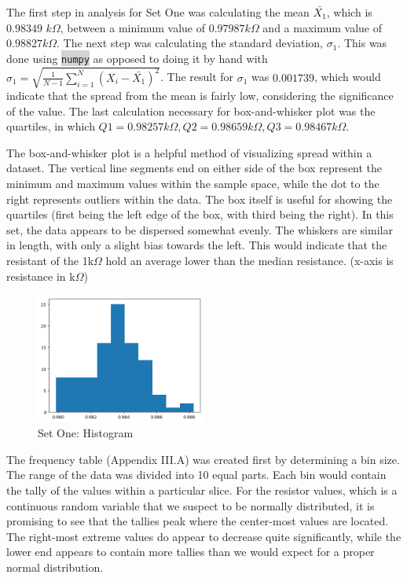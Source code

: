 \documentclass[10pt]{report}
\newcommand{\inlinecode}[2]{\colorbox{lightgray}{\lstinline[language=#1]$#2$}}
\begin{document}
The first step in analysis for Set One was calculating the mean $\bar{X_1}$, which is  $0.98349$ $k\Omega$,
between a minimum value of $0.97987 k\Omega$ and a maximum value of $0.98827 k\Omega$. The next step was calculating
the standard deviation, $\sigma_1$. This was done using \inlinecode{Python}{numpy} as opposed
to doing it by hand with $\sigma_1 = \sqrt{\frac{1}{N-1} \sum_{i=1}^N (X_i - \bar{X_1})^2}$.
The result for $\sigma_1$ was $0.001739$, which would indicate that the spread from the mean is fairly low,
considering the significance of the value.
The last calculation necessary for box-and-whisker plot was the quartiles,
in which $Q1 = 0.98257 k\Omega, Q2 = 0.98659 k\Omega, Q3 = 0.98467 k\Omega$.


The box-and-whisker plot is a helpful method of visualizing spread within a dataset.
The vertical line segments end on either side of the box represent the minimum and maximum
values within the sample space, while the dot to the right represents outliers within the data.
The box itself is useful for showing the quartiles (first being the left edge of the box, with
third being the right).
In this set, the data appears to be dispersed somewhat evenly. The whiskers are similar in length,
with only a slight bias towards the left. This would indicate that the resistant of the 1k$\Omega$
hold an average lower than the median resistance. (x-axis is resistance in k$\Omega$)

\begin{figure}
    \centering
    \includegraphics[width=0.50\textwidth]{results/resistor_histogram}
    \caption{Set One: Histogram}
\end{figure}



The frequency table (Appendix III.A) was created first by determining a bin size. The range of the data was
divided into 10 equal parts. Each bin would contain the tally of the values within
a particular slice. For the resistor values, which is a continuous random variable that we
suspect to be normally distributed, it is promising to see that the tallies peak where the center-most values are located. 
The right-most extreme values do appear to decrease quite significantly, while
the lower end appears to contain more tallies than we would expect for a proper normal distribution.
\end{document}
